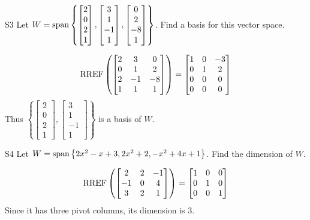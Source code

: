 \documentclass{sbgLAquiz}
\begin{document}
\begin{problem}{S3}
Let \(
  W={\rm span}\left\{
    \begin{bmatrix} 2 \\ 0 \\ 2 \\ 1 \end{bmatrix},
    \begin{bmatrix} 3 \\ 1 \\ -1 \\ 1 \end{bmatrix},
    \begin{bmatrix} 0 \\ 2 \\ -8 \\ 1 \end{bmatrix}
  \right\}
\). Find a basis for this vector space.
\end{problem}
\begin{solution}
\[
  \operatorname{RREF}\left(\begin{bmatrix}
    2 & 3 & 0 \\
    0 & 1 & 2 \\
    2 & -1 & -8 \\
    1 & 1 & 1
  \end{bmatrix} \right) =
  \begin{bmatrix}
    1 & 0 & -3 \\
    0 & 1 & 2 \\
    0 & 0 & 0 \\
    0 & 0 & 0
  \end{bmatrix}
\]
Thus \(\left\{
  \begin{bmatrix} 2 \\ 0 \\ 2 \\ 1 \end{bmatrix},
  \begin{bmatrix} 3 \\ 1 \\ -1 \\ 1 \end{bmatrix}
\right\}\) is a basis of $W$.
\end{solution}
\begin{extract}\newpage\end{extract}
\begin{problem}{S4}
  Let \(
    W={\rm span}\left\{ 2x^2-x+3, 2x^2+2, -x^2+4x+1 \right\}\).
  Find the dimension of \(W\).
\end{problem}
\begin{solution}
  \[\operatorname{RREF}\left(
    \begin{bmatrix}
      2 & 2 & -1 \\
      -1 & 0 & 4 \\
      3 & 2 & 1
    \end{bmatrix} \right)= \begin{bmatrix}
      1 & 0 &0 \\
      0 & 1 & 0 \\
      0 & 0 & 1
    \end{bmatrix}
  \]
  Since it has three pivot columns, its dimension is \(3\).
\end{solution}
\end{document}
